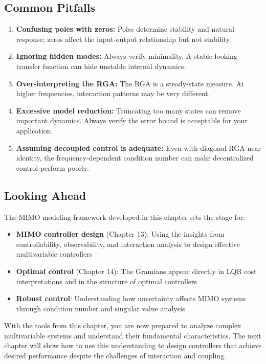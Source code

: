 \subsection{Common Pitfalls}

\begin{enumerate}
\item \textbf{Confusing poles with zeros:} Poles determine stability and natural response; zeros affect the input-output relationship but not stability.

\item \textbf{Ignoring hidden modes:} Always verify minimality. A stable-looking transfer function can hide unstable internal dynamics.

\item \textbf{Over-interpreting the RGA:} The RGA is a steady-state measure. At higher frequencies, interaction patterns may be very different.

\item \textbf{Excessive model reduction:} Truncating too many states can remove important dynamics. Always verify the error bound is acceptable for your application.

\item \textbf{Assuming decoupled control is adequate:} Even with diagonal RGA near identity, the frequency-dependent condition number can make decentralized control perform poorly.
\end{enumerate}

\subsection{Looking Ahead}

The MIMO modeling framework developed in this chapter sets the stage for:

\begin{itemize}
\item \textbf{MIMO controller design} (Chapter 13): Using the insights from controllability, observability, and interaction analysis to design effective multivariable controllers

\item \textbf{Optimal control} (Chapter 14): The Gramians appear directly in LQR cost interpretations and in the structure of optimal controllers

\item \textbf{Robust control}: Understanding how uncertainty affects MIMO systems through condition number and singular value analysis
\end{itemize}

With the tools from this chapter, you are now prepared to analyze complex multivariable systems and understand their fundamental characteristics. The next chapter will show how to use this understanding to design controllers that achieve desired performance despite the challenges of interaction and coupling.


